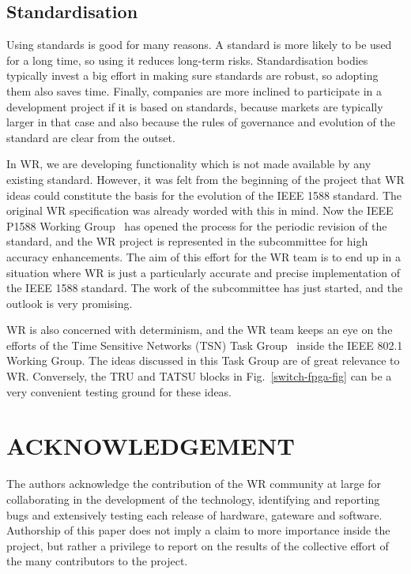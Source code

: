 \documentclass{../JAC2003}
\begin{document}
\subsection{Standardisation}

Using standards is good for many reasons. A standard is more likely to
be used for a long time, so using it reduces long-term
risks. Standardisation bodies typically invest a big effort in making
sure standards are robust, so adopting them also saves time. Finally,
companies are more inclined to participate in a development project if
it is based on standards, because markets are typically larger in that
case and also because the rules of governance and evolution of the
standard are clear from the outset.

In WR, we are developing functionality which is not made available by
any existing standard. However, it was felt from the beginning of the
project that WR ideas could constitute the basis for the evolution of
the IEEE 1588 standard. The original WR specification was already
worded with this in mind. Now the IEEE P1588 Working
Group~\cite{ptp-wg-ref} has opened the process for the periodic
revision of the standard, and the WR project is represented in the
subcommittee for high accuracy enhancements. The aim of this effort
for the WR team is to end up in a situation where WR is just a
particularly accurate and precise implementation of the IEEE 1588
standard. The work of the subcommittee has just started, and the
outlook is very promising.

WR is also concerned with determinism, and the WR team keeps an eye on
the efforts of the Time Sensitive Networks (TSN) Task
Group~\cite{tsn-ref} inside the IEEE 802.1 Working Group. The ideas
discussed in this Task Group are of great relevance to WR. Conversely,
the TRU and TATSU blocks in Fig.~\ref{switch-fpga-fig} can be a very
convenient testing ground for these ideas. 

\section{ACKNOWLEDGEMENT}

The authors acknowledge the contribution of the WR community at large
for collaborating in the development of the technology, identifying
and reporting bugs and extensively testing each release of hardware,
gateware and software. Authorship of this paper does not imply a claim
to more importance inside the project, but rather a privilege to
report on the results of the collective effort of the many
contributors to the project.
\end{document}
